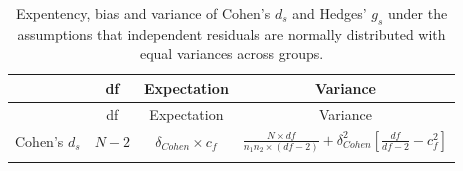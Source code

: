 \documentclass[
  english,
  man,floatsintext]{apa6}
\begin{document}
\newpage
\begin{landscape}

\begin{longtable}[]{@{}lccc@{}}
\caption{Expentency, bias and variance of Cohen's \(d_s\) and Hedges' \(g_s\) under the assumptions that independent residuals are normally distributed with equal variances across groups.}\tabularnewline
\toprule
\begin{minipage}[b]{0.12\columnwidth}\raggedright
\strut
\end{minipage} & \begin{minipage}[b]{0.11\columnwidth}\centering
df\strut
\end{minipage} & \begin{minipage}[b]{0.24\columnwidth}\centering
Expectation\strut
\end{minipage} & \begin{minipage}[b]{0.42\columnwidth}\centering
Variance\strut
\end{minipage}\tabularnewline
\midrule
\endfirsthead
\toprule
\begin{minipage}[b]{0.12\columnwidth}\raggedright
\strut
\end{minipage} & \begin{minipage}[b]{0.11\columnwidth}\centering
df\strut
\end{minipage} & \begin{minipage}[b]{0.24\columnwidth}\centering
Expectation\strut
\end{minipage} & \begin{minipage}[b]{0.42\columnwidth}\centering
Variance\strut
\end{minipage}\tabularnewline
\midrule
\endhead
\begin{minipage}[t]{0.12\columnwidth}\raggedright
Cohen's \(d_s\)\strut
\end{minipage} & \begin{minipage}[t]{0.11\columnwidth}\centering
\(N-2\)\strut
\end{minipage} & \begin{minipage}[t]{0.24\columnwidth}\centering
\(\delta_{Cohen} \times c_f\)\strut
\end{minipage} & \begin{minipage}[t]{0.42\columnwidth}\centering
\(\frac{N\times df}{n_1n_2 \times (df-2)} + \delta^2_{Cohen} \left[ \frac{df}{df-2} - c_f^2\right]\)\strut
\end{minipage}\tabularnewline
\begin{minipage}[t]{0.12\columnwidth}\raggedright
\strut

\end{minipage}
\end{longtable}
\end{landscape}
\end{document}
